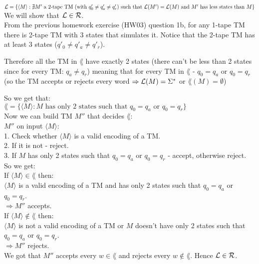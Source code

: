 $\mathcal{L} = \{\langle M \rangle : \nexists M' \text{ a 2-tape TM } (\text{with } q'_0 \neq q'_a \neq q'_r) \text{ such that } \\
    \mathcal{L}(M')=\mathcal{L}(M) \text{ and } M' \text{ has less states than } M\}$ \\

We will show that $\mathcal{L} \in \mathcal{R}$. \\

From the previous homework exercise (HW03) question 1b, for any 1-tape TM there is 2-tape TM with 3 states that simulates it.
Notice that the 2-tape TM has at least 3 states ($q'_0 \neq q'_a \neq q'_r$).

Therefore all the TM in $\lang$ have exactly 2 states (there can't be less than 2 states since for every TM: $q_a \neq q_r$)
meaning that for every TM in $\lang$ - $q_0 = q_a$ or $q_0 = q_r$ (so the TM accepts or rejects every word
$\Rightarrow \mathcal{L}(M) = \Sigma^*$ or $\lang(M) = \emptyset$)

So we get that: \\
$\lang = \{\langle M \rangle : M \text{ has only 2 states such that } q_0 = q_a \text{ or }q_0 = q_r\}$ \\

Now we can build TM $M''$ that decides $\lang$: \\
$M''$ on input $\langle M \rangle$: \\
1. Check whether $\langle M \rangle$ is a valid encoding of a TM. \\
2. If it is not - reject. \\
3. If $M$ has only 2 states such that $q_0 = q_a$ or $q_0 = q_r$ - accept, otherwise reject. \\

So we get: \\
If $\langle M \rangle \in \lang$ then: \\
$\langle M \rangle$ is a valid encoding of a TM and has only 2 states such that $q_0 = q_a$ or $q_0 = q_r$. \\
$\Longrightarrow M''$ accepts. \\

If $\langle M \rangle \notin \lang$ then: \\
$\langle M \rangle$ is not a valid encoding of a TM or $M$ doesn't have only 2 states such that $q_0 = q_a$ or $q_0 = q_r$. \\
$\Longrightarrow M''$ rejects. \\

We got that $M''$ accepts every $w \in \lang$ and rejects every $w \notin \lang$. Hence $\mathcal{L} \in \mathcal{R}$. \\
